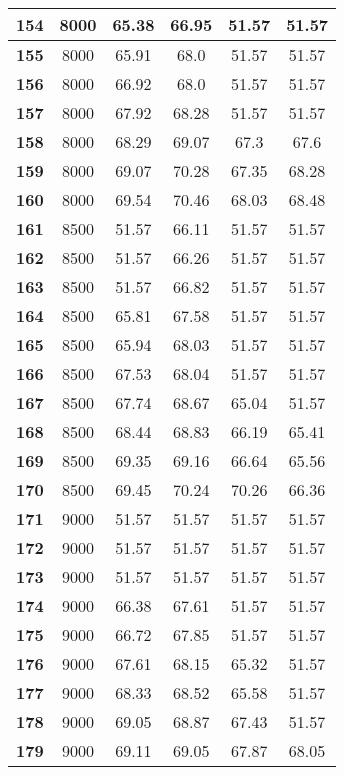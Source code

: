 \begin{longtable}{|c|c|c|c|c|c|}
\textbf{154} & 8000 & 65.38 & 66.95 & 51.57 & 51.57 \\ \hline 
\textbf{155} & 8000 & 65.91 & 68.0 & 51.57 & 51.57 \\ \hline 
\textbf{156} & 8000 & 66.92 & 68.0 & 51.57 & 51.57 \\ \hline 
\textbf{157} & 8000 & 67.92 & 68.28 & 51.57 & 51.57 \\ \hline 
\textbf{158} & 8000 & 68.29 & 69.07 & 67.3 & 67.6 \\ \hline 
\textbf{159} & 8000 & 69.07 & 70.28 & 67.35 & 68.28 \\ \hline 
\textbf{160} & 8000 & 69.54 & 70.46 & 68.03 & 68.48 \\ \hline 
\textbf{161} & 8500 & 51.57 & 66.11 & 51.57 & 51.57 \\ \hline 
\textbf{162} & 8500 & 51.57 & 66.26 & 51.57 & 51.57 \\ \hline 
\textbf{163} & 8500 & 51.57 & 66.82 & 51.57 & 51.57 \\ \hline 
\textbf{164} & 8500 & 65.81 & 67.58 & 51.57 & 51.57 \\ \hline 
\textbf{165} & 8500 & 65.94 & 68.03 & 51.57 & 51.57 \\ \hline 
\textbf{166} & 8500 & 67.53 & 68.04 & 51.57 & 51.57 \\ \hline 
\textbf{167} & 8500 & 67.74 & 68.67 & 65.04 & 51.57 \\ \hline 
\textbf{168} & 8500 & 68.44 & 68.83 & 66.19 & 65.41 \\ \hline 
\textbf{169} & 8500 & 69.35 & 69.16 & 66.64 & 65.56 \\ \hline 
\textbf{170} & 8500 & 69.45 & 70.24 & 70.26 & 66.36 \\ \hline 
\textbf{171} & 9000 & 51.57 & 51.57 & 51.57 & 51.57 \\ \hline 
\textbf{172} & 9000 & 51.57 & 51.57 & 51.57 & 51.57 \\ \hline 
\textbf{173} & 9000 & 51.57 & 51.57 & 51.57 & 51.57 \\ \hline 
\textbf{174} & 9000 & 66.38 & 67.61 & 51.57 & 51.57 \\ \hline 
\textbf{175} & 9000 & 66.72 & 67.85 & 51.57 & 51.57 \\ \hline 
\textbf{176} & 9000 & 67.61 & 68.15 & 65.32 & 51.57 \\ \hline 
\textbf{177} & 9000 & 68.33 & 68.52 & 65.58 & 51.57 \\ \hline 
\textbf{178} & 9000 & 69.05 & 68.87 & 67.43 & 51.57 \\ \hline 
\textbf{179} & 9000 & 69.11 & 69.05 & 67.87 & 68.05 \\ \hline 

\end{longtable}
